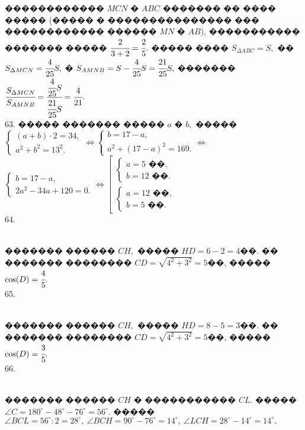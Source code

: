 \documentclass[12pt]{article}
\begin{document}
������������ $MCN$ � $ABC$ ������� �� ���� ����� (����� � ��������������� ��� ������������ ������ $MN$ � $AB$), ����������� ������� ����� $\cfrac{2}{3+2}=\cfrac{2}{5}.$ ����� ���� $S_{\Delta ABC}=S,$ �� $S_{\Delta MCN}=\cfrac{4}{25}S,$ � $S_{AMNB}=S-\cfrac{4}{25}S=\cfrac{21}{25}S,$ ������� $\cfrac{S_{\Delta MCN}}{S_{AMNB}}=\cfrac{\cfrac{4}{25}S}{\cfrac{21}{25}S}=\cfrac{4}{21}.$\\
63. ����� ������� ����� $a$ � $b,$ ����� $\begin{cases}(a+b)\cdot2=34,\\ a^2+b^2=13^2.\end{cases}\Leftrightarrow
\begin{cases}b=17-a,\\ a^2+(17-a)^2=169.\end{cases}\Leftrightarrow$\\$
\begin{cases}b=17-a,\\ 2a^2-34a+120=0.\end{cases}\Leftrightarrow
\left[\begin{array}{l}\begin{cases}a=5\text{ ��},\\ b=12\text{ ��}.\end{cases}\\ \begin{cases}a=12\text{ ��},\\ b=5\text{ ��}.\end{cases}\end{array}\right.$\\
64. \begin{figure}[ht!]
\end{figure}\\
������� ������ $CH,$ ����� $HD=6-2=4$��. �� ������� �������� $CD=\sqrt{4^2+3^2}=5$��, ����� $\cos(D)=\cfrac{4}{5}.$\\
65. \begin{figure}[ht!]
\end{figure}\\
������� ������ $CH,$ ����� $HD=8-5=3$��. �� ������� �������� $CD=\sqrt{4^2+3^2}=5$��, ����� $\cos(D)=\cfrac{3}{5}.$\\
66. \begin{figure}[ht!]
\end{figure}\\
������� ������ $CH$ � ����������� $CL.$ ����� $\angle C=180^\circ-48^\circ-76^\circ=56^\circ.$ ����� $\angle BCL=56^\circ:2=28^\circ,\ \angle BCH=90^\circ-76^\circ=14^\circ,\ \angle LCH=28^\circ-14^\circ=14^\circ.$\\
\end{document}
